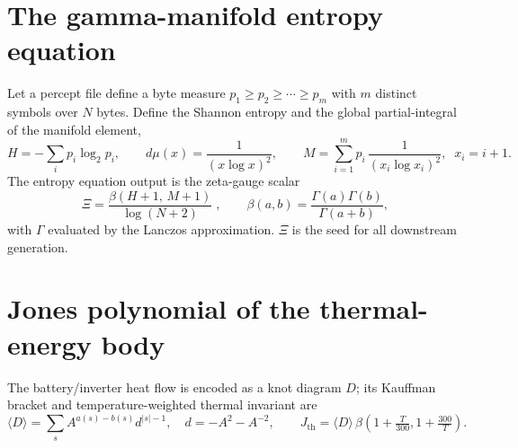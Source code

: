 \documentclass[11pt]{article}
\begin{document}
\section{The gamma-manifold entropy equation}
Let a percept file define a byte measure $p_1\ge p_2\ge\cdots\ge p_m$ with $m$
distinct symbols over $N$ bytes. Define the Shannon entropy and the global
partial-integral of the manifold element,
\begin{equation}
H=-\sum_i p_i\log_2 p_i,\qquad
d\mu(x)=\frac{1}{(x\log x)^2},\qquad
M=\sum_{i=1}^{m} p_i\,\frac{1}{(x_i\log x_i)^2},\;\; x_i=i+1 .
\end{equation}
The entropy equation output is the zeta-gauge scalar
\begin{equation}
\boxed{\;\Xi=\frac{\beta(H+1,\,M+1)}{\log(N+2)}\;},\qquad
\beta(a,b)=\frac{\Gamma(a)\Gamma(b)}{\Gamma(a+b)},
\label{eq:xi}
\end{equation}
with $\Gamma$ evaluated by the Lanczos approximation. $\Xi$ is the seed for all
downstream generation.

\section{Jones polynomial of the thermal-energy body}
The battery/inverter heat flow is encoded as a knot diagram $D$; its Kauffman
bracket and temperature-weighted thermal invariant are
\begin{equation}
\langle D\rangle=\sum_{s} A^{a(s)-b(s)} d^{|s|-1},\quad d=-A^2-A^{-2},\qquad
J_{\text{th}}=\langle D\rangle\,\beta\!\left(1+\tfrac{T}{300},1+\tfrac{300}{T}\right).
\end{equation}
\end{document}
